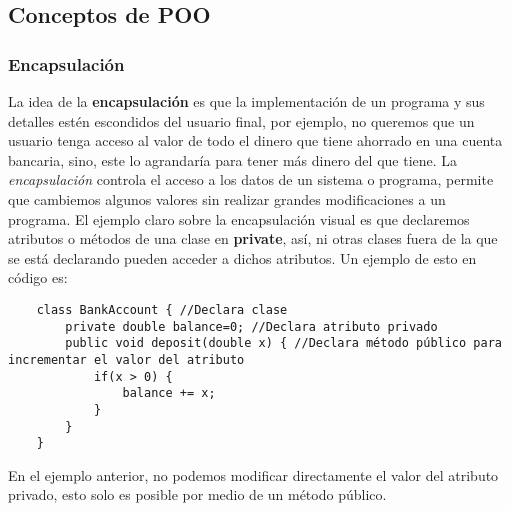 \subsection{Conceptos de POO}


\subsubsection{Encapsulación}
\hspace{0.55cm}La idea de la \textbf{encapsulación} es que la implementación de un programa y sus detalles estén escondidos del usuario final, por ejemplo, no queremos que un usuario tenga acceso al valor de todo el dinero que tiene ahorrado en una cuenta bancaria, sino, este lo agrandaría para tener más dinero del que tiene. La \textit{encapsulación} controla el acceso a los datos de un sistema o programa, permite que cambiemos algunos valores sin realizar grandes modificaciones a un programa. El ejemplo claro sobre la encapsulación visual es que declaremos atributos o métodos de una clase en \textbf{private}, así, ni otras clases fuera de la que se está declarando pueden acceder a dichos atributos. Un ejemplo de esto en código es:
\begin{lstlisting}
    class BankAccount { //Declara clase
        private double balance=0; //Declara atributo privado
        public void deposit(double x) { //Declara método público para incrementar el valor del atributo
            if(x > 0) {
                balance += x;
            }
        }
    }
\end{lstlisting}

En el ejemplo anterior, no podemos modificar directamente el valor del atributo privado, esto solo es posible por medio de un método público.



